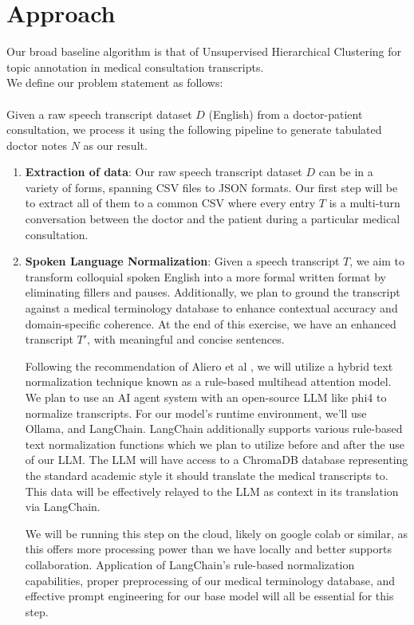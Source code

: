 \documentclass[11pt,a4paper]{article}
\begin{document}
\section{Approach}
Our broad baseline algorithm is that of Unsupervised Hierarchical Clustering for topic annotation in medical consultation transcripts. \\We define our problem statement as follows:
\\\\Given a raw speech transcript dataset $D$ (English) from a doctor-patient consultation, we process it using the following pipeline to generate tabulated doctor notes $N$ as our result.
\begin{enumerate}
    \item \textbf{Extraction of data}: Our raw speech transcript dataset $D$ can be in a variety of forms, spanning CSV files to JSON formats. Our first step will be to extract all of them to a common CSV where every entry $T$ is a multi-turn conversation between the doctor and the patient during a particular medical consultation.
    \item \textbf{Spoken Language Normalization}: Given a speech transcript $T$, we aim to transform colloquial spoken English into a more formal written format by eliminating fillers and pauses. Additionally, we plan to ground the transcript against a medical terminology database to enhance contextual accuracy and domain-specific coherence. At the end of this exercise, we have an enhanced transcript $T'$, with meaningful and concise sentences. 
        \par
        Following the recommendation of Aliero et al \cite{aliero2023systematic}, we will utilize a hybrid text normalization technique known as a rule-based multihead attention model. We plan to use an AI agent system with an open-source LLM like phi4 to normalize transcripts. For our model’s runtime environment, we’ll use Ollama, and LangChain. LangChain additionally supports various rule-based text normalization functions which we plan to utilize before and after the use of our LLM. The LLM will have access to a ChromaDB database representing the standard academic style it should translate the medical transcripts to. This data will be effectively relayed to the LLM as context in its translation via LangChain.
        \par
        We will be running this step on the cloud, likely on google colab or similar, as this offers more processing power than we have locally and better supports collaboration. Application of LangChain’s rule-based normalization capabilities, proper preprocessing of our medical terminology database, and effective prompt engineering for our base model will all be essential for this step.

\end{enumerate}
\end{document}
